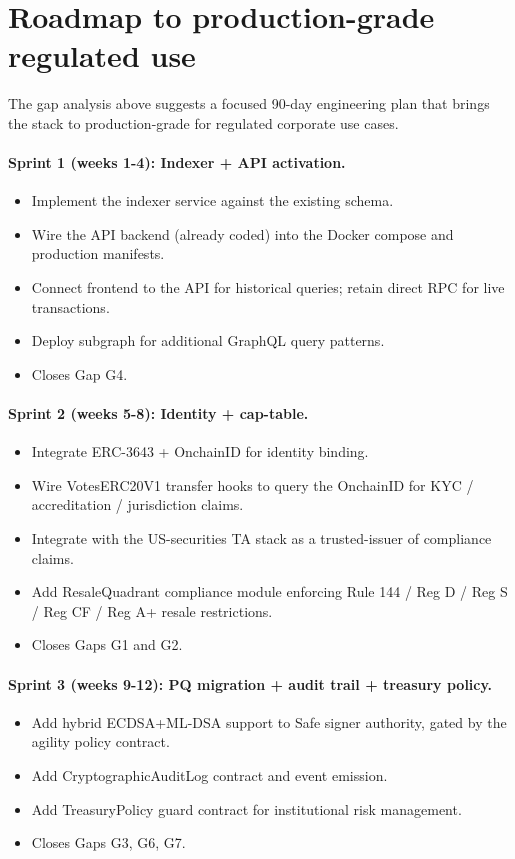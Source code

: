 \documentclass[11pt,letterpaper]{article}
\begin{document}
\section{Roadmap to production-grade regulated use}

The gap analysis above suggests a focused 90-day engineering plan that brings the stack to production-grade for regulated corporate use cases.

\paragraph{Sprint 1 (weeks 1-4): Indexer + API activation.}
\begin{itemize}
\item Implement the indexer service against the existing schema.
\item Wire the API backend (already coded) into the Docker compose and production manifests.
\item Connect frontend to the API for historical queries; retain direct RPC for live transactions.
\item Deploy subgraph for additional GraphQL query patterns.
\item Closes Gap G4.
\end{itemize}

\paragraph{Sprint 2 (weeks 5-8): Identity + cap-table.}
\begin{itemize}
\item Integrate ERC-3643 + OnchainID for identity binding.
\item Wire VotesERC20V1 transfer hooks to query the OnchainID for KYC / accreditation / jurisdiction claims.
\item Integrate with the US-securities TA stack as a trusted-issuer of compliance claims.
\item Add ResaleQuadrant compliance module enforcing Rule 144 / Reg D / Reg S / Reg CF / Reg A+ resale restrictions.
\item Closes Gaps G1 and G2.
\end{itemize}

\paragraph{Sprint 3 (weeks 9-12): PQ migration + audit trail + treasury policy.}
\begin{itemize}
\item Add hybrid ECDSA+ML-DSA support to Safe signer authority, gated by the agility policy contract.
\item Add CryptographicAuditLog contract and event emission.
\item Add TreasuryPolicy guard contract for institutional risk management.
\item Closes Gaps G3, G6, G7.
\end{itemize}
\end{document}
